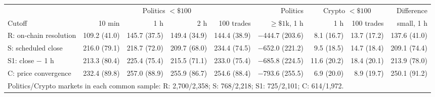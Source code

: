 \begin{tabular}{lrrrrrrrr}
\toprule
 & \multicolumn{4}{c}{Politics $<\$100$} & Politics & \multicolumn{2}{c}{Crypto $<\$100$} & Difference \\
\cmidrule(lr){2-5}\cmidrule(lr){7-8}
Cutoff & 10 min & 1 h & 2 h & 100 trades & $\ge\$1$k, 1 h & 1 h & 100 trades & small, 1 h \\
\midrule
R: on-chain resolution & 109.2 (41.0) & 145.7 (37.5) & 149.4 (34.9) & 144.4 (38.9) & \ensuremath{-}444.7 (203.6) & 8.1 (16.7) & 13.7 (17.2) & 137.6 (41.0) \\
S: scheduled close & 216.0 (79.1) & 218.7 (72.0) & 209.7 (68.0) & 234.4 (74.5) & \ensuremath{-}652.0 (221.2) & 9.5 (18.5) & 14.7 (18.4) & 209.1 (74.4) \\
S1: close $-$ 1 h & 213.3 (80.4) & 225.4 (75.4) & 215.5 (71.1) & 233.0 (75.4) & \ensuremath{-}685.8 (224.5) & 11.6 (20.2) & 18.4 (20.1) & 213.9 (78.0) \\
C: price convergence & 232.4 (89.8) & 257.0 (88.9) & 255.9 (86.7) & 254.6 (88.4) & \ensuremath{-}793.6 (255.5) & 6.9 (20.0) & 8.9 (19.7) & 250.1 (91.2) \\
\midrule
\multicolumn{9}{l}{Politics/Crypto markets in each common sample: R: 2,700/2,358; S: 768/2,218; S1: 725/2,101; C: 614/1,972.} \\
\bottomrule
\end{tabular}
